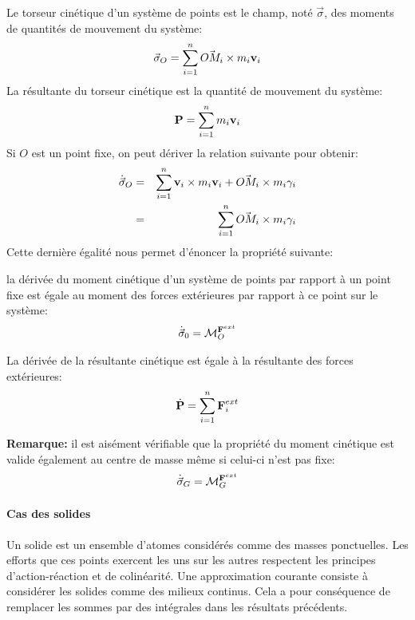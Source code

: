 Le torseur cinétique d'un système de points est le champ, noté $\vec{\sigma}$, des
moments de quantités de mouvement du système:
$$
\vec{\sigma}_{O} = \sum_{i=1}^n \vec{OM_i} \crossprod m_i \vi
$$
La résultante du torseur cinétique est la quantité de mouvement du
système:
$$
\vect{P} = \sum_{i=1}^n m_i \vi
$$
Si $O$ est un point fixe, on peut dériver la relation suivante
pour obtenir:
\begin{eqnarray*}
  \dot{\vec{\sigma}}_O &=& \sum_{i=1}^n \vi \crossprod m_i \vi + \vec{OM_i}
  \crossprod m_i \gammai \\
  &=& \sum_{i=1}^n \vec{OM_i} \crossprod m_i \gammai
\end{eqnarray*}
Cette dernière égalité nous permet d'énoncer la propriété suivante:
\begin{property}
  la dérivée du moment cinétique d'un système de points par rapport à un
  point fixe est égale au
  moment des forces extérieures par rapport à ce point sur le système:
  \begin{equation}\label{eq:newton3}
    \dot{\vec{\sigma}}_0 = \moment{\vect{F}^{ext}}{O}
  \end{equation}

  La dérivée de la résultante cinétique est égale à la résultante des
  forces extérieures:
  \begin{equation}\label{eq:newton2}
    \dot{\vect{P}} = \sum_{i=1}^n \vect{F}_i^{ext}
  \end{equation}

\end{property}

\textbf{Remarque:} il est aisément vérifiable que la propriété du
moment cinétique est valide également au centre de masse même si
celui-ci n'est pas fixe:
$$
\dot{\vec{\sigma}}_G = \moment{\vect{F}^{ext}}{G}
$$

\paragraph{Cas des solides}

Un solide est un ensemble d'atomes considérés comme des masses
ponctuelles. Les efforts que ces points exercent les uns sur les
autres respectent les principes d'action-réaction et de colinéarité.
Une approximation courante consiste à considérer les solides comme des
milieux continus. Cela a pour conséquence de remplacer les sommes par
des intégrales dans les résultats précédents.

